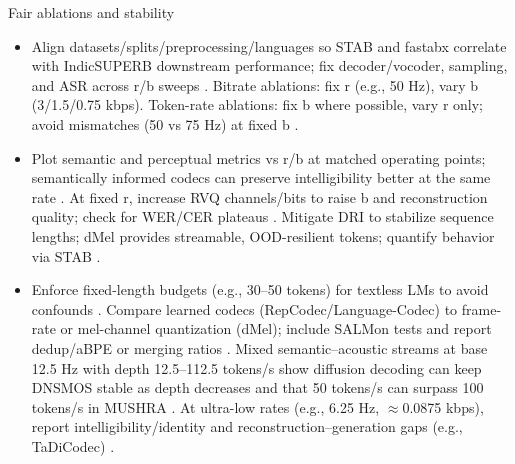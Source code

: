 \documentclass{article}
\begin{document}
Fair ablations and stability
\begin{itemize}
  \item Align datasets/splits/preprocessing/languages so STAB and fastabx correlate with IndicSUPERB downstream performance; fix decoder/vocoder, sampling, and ASR across r/b sweeps \cite{vashishth2024stabspeechtokenizerassessmentbenchmark,poli2025fastabxlibraryefficientcomputationabxdis,entry2025indicsuperbspeechprocessinguniversalperf}. Bitrate ablations: fix r (e.g., 50 Hz), vary b (3/1.5/0.75 kbps). Token-rate ablations: fix b where possible, vary r only; avoid mismatches (50 vs 75 Hz) at fixed b \cite{ahasan2025dmcodecdistillingmultimodalrepresentatio,li2024investigatingneuralaudiocodecsspeechlang}.
  \item Plot semantic and perceptual metrics vs r/b at matched operating points; semantically informed codecs can preserve intelligibility better at the same rate \cite{ye2024codecdoesmatterexploringsemanticshortcom}. At fixed r, increase RVQ channels/bits to raise b and reconstruction quality; check for WER/CER plateaus \cite{li2024investigatingneuralaudiocodecsspeechlang}. Mitigate DRI to stabilize sequence lengths; dMel provides streamable, OOD-resilient tokens; quantify behavior via STAB \cite{bai2025dmelspeechtokenizationmadesimple,liu2024analyzingmitigatinginconsistencydiscrete,vashishth2024stabspeechtokenizerassessmentbenchmark}.
  \item Enforce fixed-length budgets (e.g., 30--50 tokens) for textless LMs to avoid confounds \cite{hsu2024exploringcontextlearningtextlessspeechla}. Compare learned codecs (RepCodec/Language-Codec) to frame-rate or mel-channel quantization (dMel); include SALMon tests and report dedup/aBPE or merging ratios \cite{huang2024repcodecspeechrepresentationcodectokeniz,ji2025languagecodecbridgingdiscreterepresentat,zhang2025impactframeratesspeechtokenizercasestudy,maimon2025salmonsuiteacousticlanguagemodelevaluati}. Mixed semantic--acoustic streams at base 12.5 Hz with depth 12.5--112.5 tokens/s show diffusion decoding can keep DNSMOS stable as depth decreases and that 50 tokens/s can surpass 100 tokens/s in MUSHRA \cite{yang2025diffsoundstreamefficientspeechtokenizati,zeng2024scalingspeechtextpretrainingsyntheticint}. At ultra-low rates (e.g., 6.25 Hz, $\approx$0.0875 kbps), report intelligibility/identity and reconstruction--generation gaps (e.g., TaDiCodec) \cite{wang2025tadicodectextawarediffusionspeechtokeniz}.
\end{itemize}
\end{document}
